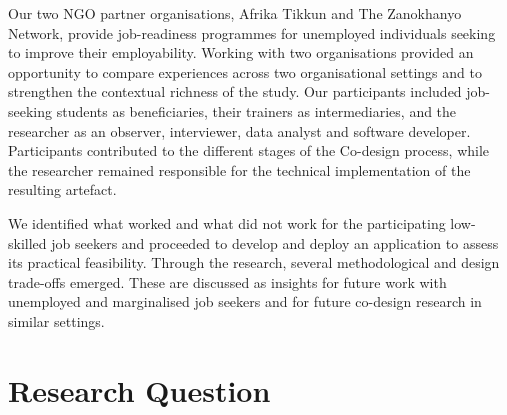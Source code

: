 Our two NGO partner organisations, Afrika Tikkun and The Zanokhanyo Network, provide job-readiness programmes for unemployed individuals seeking to improve their employability. Working with two organisations provided an opportunity to compare experiences across two organisational settings and to strengthen the contextual richness of the study. Our participants included job-seeking students as beneficiaries, their trainers as intermediaries, and the researcher as an observer, interviewer, data analyst and software developer. Participants contributed to the different stages of the Co-design process, while the researcher remained responsible for the technical implementation of the resulting artefact.

We identified what worked and what did not work for the participating low-skilled job seekers and proceeded to develop and deploy an application to assess its practical feasibility. Through the research, several methodological and design trade-offs emerged. These are discussed as insights for future work with unemployed and marginalised job seekers and for future co-design research in similar settings.

\section{Research Question}

